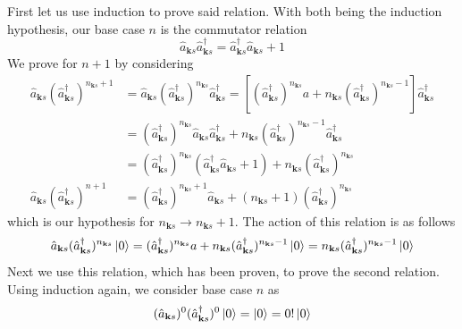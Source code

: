 \documentclass[../../../main.tex]{subfiles}
\begin{document}
First let us use induction to prove said relation.
With both being the induction hypothesis, our base case $n$ is the commutator relation
\begin{equation*}
  \hat{a}_{\mathbf{k }s} \hat{a}^\dagger_{\mathbf{k }s} =\hat{a}^\dagger_{\mathbf{k }s} \hat{a}_{\mathbf{k }s} +1
\end{equation*}
We prove for $n+1$ by considering
\begin{align*}
  \hat{a}_{\mathbf{k }s} (\hat{a}^\dagger_{\mathbf{k }s} )^{n_{\mathbf{k }s}+1}
                                                                 &
  = \hat{a}_{\mathbf{k }s} (\hat{a}^\dagger_{\mathbf{k }s} )^{n_{\mathbf{k }s}} \hat{a}^\dagger_{\mathbf{k }s}
  =[(\hat{a}^\dagger_{\mathbf{k }s} )^{n_{\mathbf{k }s}} a +{n_{\mathbf{k }s}} (\hat{a}^\dagger_{\mathbf{k }s} )^{{n_{\mathbf{k }s}}-1}]\hat{a}^\dagger_{\mathbf{k }s}                                                    \\
                                                                 &
  = (\hat{a}^\dagger_{\mathbf{k }s} )^{n_{\mathbf{k }s}} \hat{a}_{\mathbf{k }s} \hat{a}^\dagger_{\mathbf{k }s}+ {n_{\mathbf{k }s}} (\hat{a}^\dagger_{\mathbf{k }s} )^{{n_{\mathbf{k }s}}-1}\hat{a}^\dagger_{\mathbf{k }s} \\
                                                                 &
  =  (\hat{a}^\dagger_{\mathbf{k }s} )^{n_{\mathbf{k }s}} (\hat{a}^\dagger_{\mathbf{k }s}  \hat{a}_{\mathbf{k }s} +1)+{n_{\mathbf{k }s}} (\hat{a}^\dagger_{\mathbf{k }s} )^{n_{\mathbf{k }s}}                             \\
  \hat{a}_{\mathbf{k }s} (\hat{a}^\dagger_{\mathbf{k }s} )^{n+1} & =
  (\hat{a}^\dagger_{\mathbf{k }s} )^{{n_{\mathbf{k }s}}+1}\hat{a}_{\mathbf{k }s} + ({n_{\mathbf{k }s}}+1)(\hat{a}^\dagger_{\mathbf{k }s} )^{n_{\mathbf{k }s}}
\end{align*}
which is our hypothesis for ${n_{\mathbf{k }s}} \to {n_{\mathbf{k }s}}+1$.
The action of this relation is as follows
\begin{equation*}
  \hat{a}_{\mathbf{k }s} (\hat{a}^\dagger_{\mathbf{k }s} )^{n_{\mathbf{k }s}} \ket{0}
  =(\hat{a}^\dagger_{\mathbf{k }s} )^{n_{\mathbf{k }s}} a +{n_{\mathbf{k }s}} (\hat{a}^\dagger_{\mathbf{k }s} )^{{n_{\mathbf{k }s}}-1}   \ket{0}= {n_{\mathbf{k }s}} (\hat{a}^\dagger_{\mathbf{k }s} )^{{n_{\mathbf{k }s}}-1}\ket{0}
\end{equation*}
Next we use this relation, which has been proven, to prove the second relation.
Using induction again, we consider base case $n$ as
\begin{equation*}
  (\hat{a}_{\mathbf{k }s} )^0 (\hat{a}^\dagger_{\mathbf{k }s} )^0 \ket{0} = \ket{0}=0!\ket{0}
\end{equation*}
\end{document}
